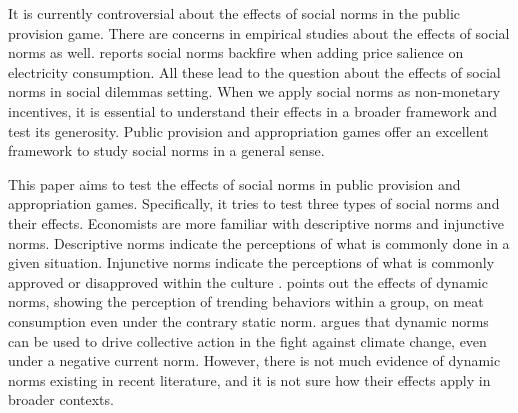 \documentclass[12pt]{article}
\begin{document}
It is currently controversial about the effects of social norms in the public provision game. There are concerns in empirical studies about the effects of social norms as well. \cite{pellerano2017extrinsic} reports social norms backfire when adding price salience on electricity consumption. All these lead to the question about the effects of social norms in social dilemmas setting. When we apply social norms as non-monetary incentives, it is essential to understand their effects in a broader framework and test its generosity. Public provision and appropriation games offer an excellent framework to study social norms in a general sense.

This paper aims to test the effects of social norms in public provision and appropriation games. Specifically, it tries to test three types of social norms and their effects. Economists are more familiar with descriptive norms and injunctive norms. Descriptive norms indicate the perceptions of what is commonly done in a given situation. Injunctive norms indicate the perceptions of what is commonly approved or disapproved within the culture \citep{reno1993transsituational}. \cite{sparkman2017dynamic} points out the effects of dynamic norms, showing the perception of trending behaviors within a group, on meat consumption even under the contrary static norm. \cite{sparkman2021social}  argues that dynamic norms can be used to drive collective action in the fight against climate change, even under a negative current norm. However, there is not much evidence of dynamic norms existing in recent literature, and it is not sure how their effects apply in broader contexts.
\end{document}
